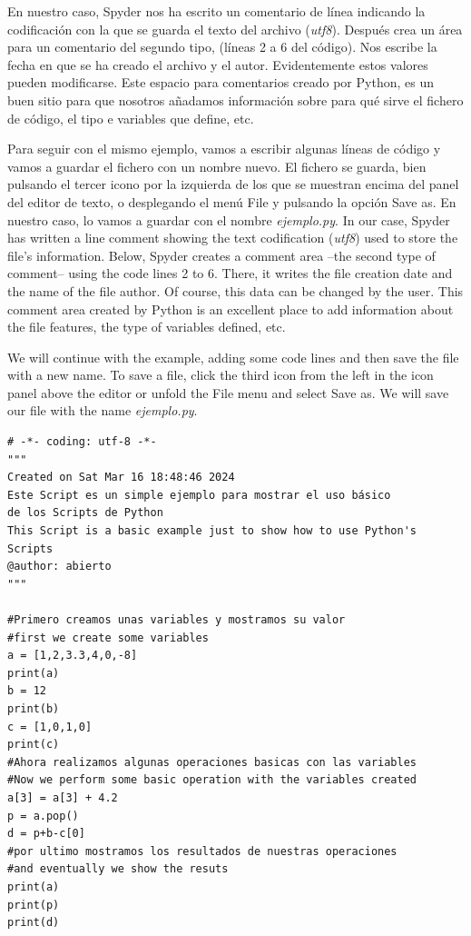 \begin{paracol}{2}
En nuestro caso, Spyder nos ha escrito un comentario de línea indicando la codificación con la que se guarda el texto del archivo (\emph{utf8}). Después crea un área para un comentario del segundo tipo, (líneas 2  a 6 del código). Nos escribe la fecha en que se ha creado el archivo y el autor. Evidentemente estos valores pueden modificarse. Este espacio para comentarios creado por Python, es un buen sitio para que nosotros añadamos información sobre para qué sirve el fichero de código, el tipo e variables que define, etc.

Para seguir con el mismo ejemplo, vamos a escribir algunas líneas de código y vamos a guardar el fichero con un nombre nuevo. El fichero se guarda, bien pulsando el tercer icono por la izquierda de los que se muestran encima del panel del editor de texto, o desplegando el menú File y pulsando la opción Save as. En nuestro caso, lo vamos a guardar con el nombre \emph{ejemplo.py}.
\switchcolumn
In our case, Spyder has written a line comment showing the text codification (\emph{utf8}) used to store the file's information. Below, Spyder creates a comment area --the second type of comment-- using the code lines 2 to 6. There, it writes the file creation date and the name of the file author. Of course, this data can be changed by the user. This comment area created by Python is an excellent place to add information about the file features, the type of variables defined, etc.

We will continue with the example, adding some code lines and then save the file with a new name. To save a file, click the third icon from the left in the icon panel above the editor or unfold the File menu and select Save as. We will save our file with the name \emph{ejemplo.py}.
\end{paracol}

\begin{verbatim}
# -*- coding: utf-8 -*-
"""
Created on Sat Mar 16 18:48:46 2024
Este Script es un simple ejemplo para mostrar el uso básico
de los Scripts de Python
This Script is a basic example just to show how to use Python's
Scripts
@author: abierto 
"""

#Primero creamos unas variables y mostramos su valor
#first we create some variables
a = [1,2,3.3,4,0,-8]
print(a)
b = 12
print(b)
c = [1,0,1,0]
print(c)
#Ahora realizamos algunas operaciones basicas con las variables
#Now we perform some basic operation with the variables created
a[3] = a[3] + 4.2
p = a.pop()
d = p+b-c[0]
#por ultimo mostramos los resultados de nuestras operaciones
#and eventually we show the resuts 
print(a)
print(p)
print(d)
\end{verbatim}

